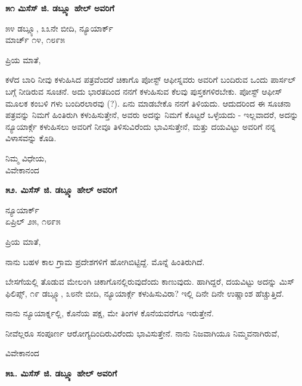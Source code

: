 \begin{center}
\textbf{೫೧ ಮಿಸೆಸ್ ಜಿ. ಡಬ್ಲ್ಯೂ ಹೇಲ್ ಅವರಿಗೆ}
\end{center}

\begin{flushright}
೫೪ ಡಬ್ಲ್ಯೂ, ೩೩ನೇ ಬೀದಿ, ನ್ಯೂಯಾರ್ಕ್\\ಮಾರ್ಚ್ ೧೪, ೧೮೯೫
\end{flushright}

ಪ್ರಿಯ ಮಾತೆ,

ಕಳೆದ ಬಾರಿ ನೀವು ಕಳುಹಿಸಿದ ಪತ್ರವೆಂದರೆ ಚಿಕಾಗೊ ಪೋಸ್ಟ್ ಆಫೀಸ್ನವರು ಅವರಿಗೆ ಬಂದಿರುವ ಒಂದು ಪಾರ್ಸಲ್ ಬಗ್ಗೆ ನೀಡಿರುವ ಸೂಚನೆ. ಅದು ಭಾರತದಿಂದ ನನಗೆ ಕಳುಹಿಸುವ ಕೆಲವು ಪುಸ್ತಕಗಳಿರಬೇಕು. ಪೋಸ್ಟ್ ಆಫೀಸ್ ಮೂಲಕ ಕಂಬಳಿ ಗಳು ಬಂದಿರಲಾರವು (?). ಏನು ಮಾಡಬೇಕೊ ನನಗೆ ತಿಳಿಯದು. ಆದುದರಿಂದ ಈ ಸೂಚನಾ ಪತ್ರವನ್ನು ನಿಮಗೆ ಹಿಂತಿರುಗಿ ಕಳುಹಿಸುತ್ತೇನೆ, ಅವರು ಅದನ್ನು ನಿಮಗೆ ಕೊಟ್ಟರೆ ಒಳ್ಳೆಯದು - ಇಲ್ಲವಾದರೆ, ಅದನ್ನು ನ್ಯೂಯಾರ್ಕ್ಗೆ ಕಳುಹಿಸಲು ಅವರಿಗೆ ನೀವೂ ತಿಳಿಸುವಿರೆಂದು ಭಾವಿಸುತ್ತೇನೆ, ಮತ್ತು ದಯವಿಟ್ಟು ಅವರಿಗೆ ನನ್ನ ವಿಳಾಸವನ್ನು ಕೊಡಿ.

\begin{flushright}
ನಿಮ್ಮ ವಿಧೇಯ,\\ವಿವೇಕಾನಂದ
\end{flushright}

\begin{center}
\textbf{೫೨. ಮಿಸೆಸ್ ಜಿ. ಡಬ್ಲ್ಯೂ ಹೇಲ್ ಅವರಿಗೆ}
\end{center}

\begin{flushright}
ನ್ಯೂಯಾರ್ಕ್\\ಏಪ್ರಿಲ್ ೨೫, ೧೮೯೫
\end{flushright}

ಪ್ರಿಯ ಮಾತೆ,

ನಾನು ಬಹಳ ಕಾಲ ಗ್ರಾಮ ಪ್ರದೇಶಗಳಿಗೆ ಹೋಗಿಬಿಟ್ಟಿದ್ದೆ. ಮೊನ್ನೆ ಹಿಂತಿರುಗಿದೆ.

ಬೇಸಗೆಯಲ್ಲಿ ತೊಡುವ ಮೇಲಂಗಿ ಚಿಕಾಗೊನಲ್ಲಿರುವುದೆಂದು ಕಾಣುವುದು. ಹಾಗಿದ್ದರೆ, ದಯವಿಟ್ಟು ಅದನ್ನು  ಮಿಸ್ ಫಿಲಿಪ್ಸ್, ೧೯ ಡಬ್ಲ್ಯೂ, ೩೮ನೇ ಬೀದಿ, ನ್ಯೂಯಾರ್ಕ್ಗೆ ಕಳುಹಿಸುವಿರಾ? ಇಲ್ಲಿ ದಿನೇ ದಿನೇ ಉಷ್ಣಾಂಶ ಹೆಚ್ಚುತ್ತಿದೆ.

ನಾನು ನ್ಯೂಯಾರ್ಕ್ನಲ್ಲಿ, ಕೊನೆಯ ಪಕ್ಷ, ಮೇ ತಿಂಗಳ ಕೊನೆಯವರೆಗೂ ಇರುತ್ತೇನೆ.

ನೀವೆಲ್ಲರೂ ಸಂಪೂರ್ಣ ಆರೋಗ್ಯದಿಂದಿರುವಿರೆಂದು ಭಾವಿಸುತ್ತೇನೆ. ನಾನು ನಿಜವಾಗಿಯೂ ನಿಮ್ಮವನಾಗಿರುವೆ,

\begin{flushright}
ವಿವೇಕಾನಂದ
\end{flushright}

\begin{center}
\textbf{೫೩. ಮಿಸೆಸ್ ಜಿ. ಡಬ್ಲ್ಯೂ ಹೇಲ್ ಅವರಿಗೆ}
\end{center}

